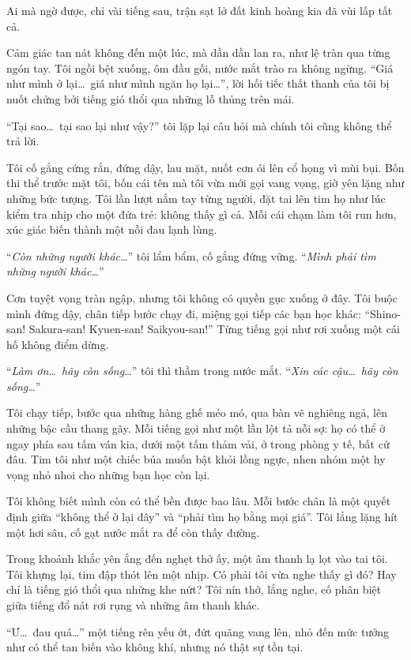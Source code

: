 \documentclass[../main.tex]{subfiles}
\begin{document}
Ai mà ngờ được, chỉ vài tiếng sau, trận sạt lở đất kinh hoàng kia đã vùi lấp tất cả.

Cảm giác tan nát không đến một lúc, mà dần dần lan ra, như lệ tràn qua từng ngón tay. Tôi ngồi bệt xuống, ôm đầu gối, nước mắt trào ra không ngừng. ``Giá như mình ở lại\dots\ giá như mình ngăn họ lại\dots'', lời hối tiếc thất thanh của tôi bị nuốt chửng bởi tiếng gió thổi qua những lỗ thủng trên mái.

``Tại sao\dots\ tại sao lại như vậy?'' tôi lặp lại câu hỏi mà chính tôi cũng không thể trả lời.

Tôi cố gắng cứng rắn, đứng dậy, lau mặt, nuốt cơn ói lên cổ họng vì mùi bụi. Bốn thi thể trước mặt tôi, bốn cái tên mà tôi vừa mới gọi vang vọng, giờ yên lặng như những bức tượng. Tôi lần lượt nắm tay từng người, đặt tai lên tim họ như lúc kiểm tra nhịp cho một đứa trẻ: không thấy gì cả. Mỗi cái chạm làm tôi run hơn, xúc giác biến thành một nỗi đau lạnh lùng.

``\textit{Còn những người khác\dots}'' tôi lẩm bẩm, cố gắng đứng vững. ``\textit{Mình phải tìm những người khác\dots}''

Cơn tuyệt vọng tràn ngập, nhưng tôi không có quyền gục xuống ở đây. Tôi buộc mình đứng dậy, chân tiếp bước chạy đi, miệng gọi tiếp các bạn học khác: ``Shino-san! Sakura-san! Kyuen-san! Saikyou-san!'' Từng tiếng gọi như rơi xuống một cái hố không điểm dừng.

``\textit{Làm ơn\dots\ hãy còn sống\dots}'' tôi thì thầm trong nước mắt. ``\textit{Xin các cậu\dots\ hãy còn sống\dots}''

Tôi chạy tiếp, bước qua những hàng ghế méo mó, qua bàn vẽ nghiêng ngả, lên những bậc cầu thang gãy. Mỗi tiếng gọi như một lần lột tả nỗi sợ: họ có thể ở ngay phía sau tấm ván kia, dưới một tấm thảm vải, ở trong phòng y tế, bất cứ đâu. Tim tôi như một chiếc búa muốn bật khỏi lồng ngực, nhen nhóm một hy vọng nhỏ nhoi cho những bạn học còn lại.

Tôi không biết mình còn có thể bền được bao lâu. Mỗi bước chân là một quyết định giữa ``không thể ở lại đây'' và ``phải tìm họ bằng mọi giá''. Tôi lẳng lặng hít một hơi sâu, cố gạt nước mắt ra để còn thấy đường.

Trong khoảnh khắc yên ắng đến nghẹt thở ấy, một âm thanh lạ lọt vào tai tôi. Tôi khựng lại, tim đập thót lên một nhịp. Có phải tôi vừa nghe thấy gì đó? Hay chỉ là tiếng gió thổi qua những khe nứt? Tôi nín thở, lắng nghe, cố phân biệt giữa tiếng đổ nát rơi rụng và những âm thanh khác.

``Ư\dots\ đau quá\dots'' một tiếng rên yếu ớt, đứt quãng vang lên, nhỏ đến mức tưởng như có thể tan biến vào không khí, nhưng nó thật sự tồn tại.
\end{document}
